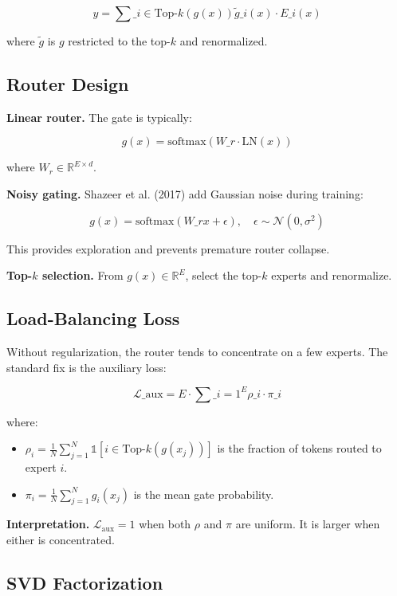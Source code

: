 \[
y = \sum\_{i \in \text{Top-}k(g(x))} \tilde{g}\_i(x) \cdot E\_i(x)
\tag{3.2}
\]

where $\tilde{g}$ is $g$ restricted to the top-$k$ and renormalized.

\subsection{Router Design}

\textbf{Linear router.} The gate is typically:

\[
g(x) = \text{softmax}(W\_r \cdot \text{LN}(x))
\tag{3.3}
\]

where $W_r \in \mathbb{R}^{E \times d}$.

\textbf{Noisy gating.} Shazeer et al. (2017) add Gaussian noise during training:

\[
g(x) = \text{softmax}(W\_r x + \epsilon), \quad \epsilon \sim \mathcal{N}(0, \sigma^2)
\tag{3.4}
\]

This provides exploration and prevents premature router collapse.

\textbf{Top-$k$ selection.} From $g(x) \in \mathbb{R}^E$, select the top-$k$ experts 
and renormalize.

\subsection{Load-Balancing Loss}

Without regularization, the router tends to concentrate on a few experts. 
The standard fix is the auxiliary loss:

\[
\mathcal{L}\_\text{aux} = E \cdot \sum\_{i=1}^{E} \rho\_i \cdot \pi\_i
\tag{3.5}
\]

where:
\begin{itemize}
\item $\rho_i = \frac{1}{N} \sum_{j=1}^{N} \mathbb{1}[i \in \text{Top-}k(g(x_j))]$ is
  the fraction of tokens routed to expert $i$.
\item $\pi_i = \frac{1}{N} \sum_{j=1}^{N} g_i(x_j)$ is the mean gate probability.

\end{itemize}
\textbf{Interpretation.} $\mathcal{L}_\text{aux} = 1$ when both $\rho$ and $\pi$ are 
uniform. It is larger when either is concentrated.

\subsection{SVD Factorization}

